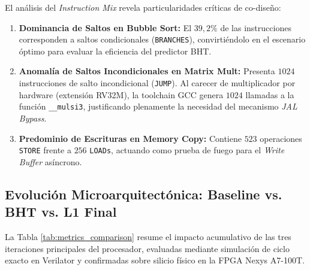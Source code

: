\documentclass[10pt,a4paper]{article}
\begin{document}
El análisis del \textit{Instruction Mix} revela particularidades críticas de co-diseño:
\begin{enumerate}
    \item \textbf{Dominancia de Saltos en Bubble Sort:} El $39,2\%$ de las instrucciones corresponden a saltos condicionales (\texttt{BRANCHES}), convirtiéndolo 
    en el escenario óptimo para evaluar la eficiencia del predictor BHT.
    \item \textbf{Anomalía de Saltos Incondicionales en Matrix Mult:} Presenta $1024$ instrucciones de salto incondicional (\texttt{JUMP}). Al carecer de
    multiplicador por hardware (extensión RV32M), la toolchain GCC genera $1024$ llamadas a la función \texttt{\_\_mulsi3}, justificando plenamente la necesidad
    del mecanismo \textit{JAL Bypass}.
    \item \textbf{Predominio de Escrituras en Memory Copy:} Contiene $523$ operaciones \texttt{STORE} frente a $256$ \texttt{LOADs}, actuando como prueba de
    fuego para el \textit{Write Buffer} asíncrono.
\end{enumerate}

\subsection{Evolución Microarquitectónica: Baseline vs. BHT vs. L1 Final}

La Tabla \ref{tab:metrics_comparison} resume el impacto acumulativo de las tres iteraciones principales del procesador, evaluadas mediante simulación de ciclo
exacto en Verilator y confirmadas sobre silicio físico en la FPGA Nexys A7-100T.
\end{document}
